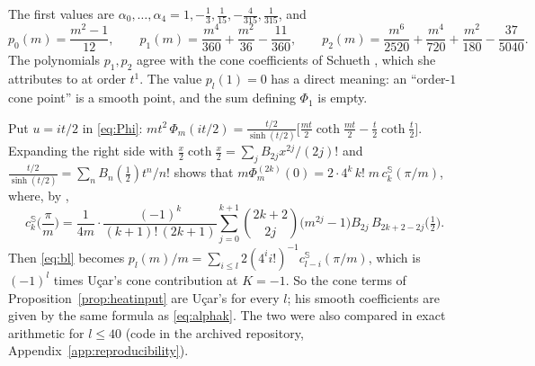 The first values are $\alpha_0,\dots,\alpha_4=1,-\tfrac13,\tfrac1{15},-\tfrac4{315},\tfrac1{315}$, and
\begin{equation}\label{eq:plexplicit}
  p_0(m)=\frac{m^2-1}{12},\qquad p_1(m)=\frac{m^4}{360}+\frac{m^2}{36}-\frac{11}{360},\qquad p_2(m)=\frac{m^6}{2520}+\frac{m^4}{720}+\frac{m^2}{180}-\frac{37}{5040}.
\end{equation}
The polynomials $p_1,p_2$ agree with the cone coefficients of Schueth \cite[Rem.~4.2, Thm~4.1]{schueth2019},
which she attributes to \cite[\S5.6]{dggw2008} at order $t^1$.
The value $p_l(1)=0$ has a direct meaning: an ``order-$1$ cone point'' is a smooth point, and the sum
defining $\Phi_1$ is empty.

\begin{remark}\label{rem:ucaragree}
Put $u=it/2$ in \eqref{eq:Phi}: $m t^2\,\Phi_m(it/2)=\frac{t/2}{\sinh(t/2)}\big[\frac{mt}2\coth\frac{mt}2-\frac t2\coth\frac t2\big]$.
Expanding the right side with $\frac x2\coth\frac x2=\sum_jB_{2j}x^{2j}/(2j)!$ and
$\frac{t/2}{\sinh(t/2)}=\sum_nB_n(\frac12)t^n/n!$ shows that $m\Phi_m^{(2k)}(0)=2\cdot4^k\,k!\;m\,c^{\mathbb S}_k(\pi/m)$,
where, by \cite[(4.25)]{ucar2017},
\[
  c^{\mathbb S}_k\Big(\frac\pi m\Big)=\frac1{4m}\cdot\frac{(-1)^k}{(k+1)!\,(2k+1)}\sum_{j=0}^{k+1}\binom{2k+2}{2j}\big(m^{2j}-1\big)B_{2j}\,B_{2k+2-2j}\big(\tfrac12\big).
\]
Then \eqref{eq:bl} becomes $p_l(m)/m=\sum_{i\le l}2(4^ii!)^{-1}c^{\mathbb S}_{l-i}(\pi/m)$, which is $(-1)^l$
times U\c{c}ar's cone contribution \cite[(4.33)--(4.34)]{ucar2017} at $K=-1$. So the cone terms of
Proposition~\ref{prop:heatinput} are U\c{c}ar's for every $l$; his smooth coefficients
\cite[(4.35)]{ucar2017} are given by the same formula as \eqref{eq:alphak}. The two were also compared in
exact arithmetic for $l\le40$ (code in the archived repository, Appendix~\ref{app:reproducibility}).
\end{remark}

%
